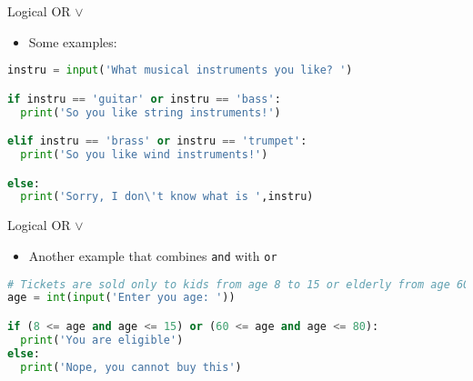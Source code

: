 \documentclass[10pt,xcolor={table,dvipsnames},t]{beamer}
\begin{document}
\begin{frame}[fragile]{Logical OR $\lor$}
  \begin{itemize}
    \item Some examples:
  \end{itemize}
\begin{lstlisting}[language=python]
instru = input('What musical instruments you like? ')

if instru == 'guitar' or instru == 'bass':
  print('So you like string instruments!')

elif instru == 'brass' or instru == 'trumpet':
  print('So you like wind instruments!')

else:
  print('Sorry, I don\'t know what is ',instru)
\end{lstlisting}
\end{frame}

\begin{frame}[fragile]{Logical OR $\lor$}
  \begin{itemize}
    \item Another example that combines \texttt{and} with \texttt{or}
  \end{itemize}
\begin{lstlisting}[language=python]
# Tickets are sold only to kids from age 8 to 15 or elderly from age 60-80
age = int(input('Enter you age: '))

if (8 <= age and age <= 15) or (60 <= age and age <= 80):
  print('You are eligible')
else:
  print('Nope, you cannot buy this')
\end{lstlisting}
\end{frame}
\end{document}
